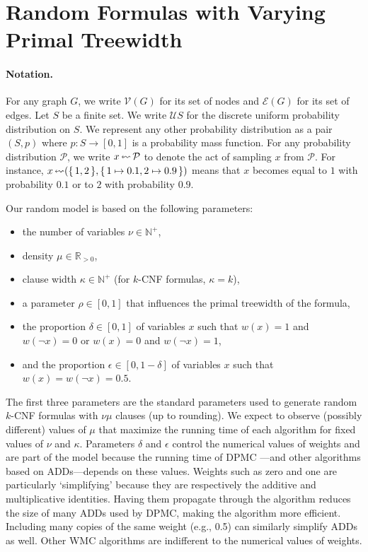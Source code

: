 \section{Random Formulas with Varying Primal Treewidth}\label{sec:model}

\paragraph*{Notation.}
For any graph $G$, we write $\mathcal{V}(G)$ for its set of nodes and
$\mathcal{E}(G)$ for its set of edges. Let $S$ be a finite set. We write
$\mathcal{U}S$ for the discrete uniform probability distribution on $S$. We
represent any other probability distribution as a pair $(S, p)$ where $p\colon S
\to [0, 1]$ is a probability mass function. For any probability distribution
$\mathcal{P}$, we write $x \leftlsquigarrow \mathcal{P}$ to denote the act of
sampling $x$ from $\mathcal{P}$. For instance, $x \leftlsquigarrow (\{\, 1, 2 \,\}, \{\, 1 \mapsto 0.1, 2 \mapsto 0.9 \,\})$ means that $x$ becomes equal to $1$ with probability $0.1$ or to $2$ with probability $0.9$.

Our random model is based on the following parameters:
\begin{itemize}
\item the number of variables $\nu \in \mathbb{N}^+$,
\item density $\mu \in \mathbb{R}_{>0}$,
\item clause width $\kappa \in \mathbb{N}^+$ (for $k$-CNF formulas, $\kappa =
  k$),
\item a parameter $\rho \in [0, 1]$ that influences the primal treewidth of
  the formula,
\item the proportion $\delta \in [0, 1]$ of variables $x$ such that $w(x) = 1$
  and $w(\neg x) = 0$ or $w(x) = 0$ and $w(\neg x) = 1$,
\item and the proportion $\epsilon \in [0, 1-\delta]$ of variables $x$ such that
  $w(x) = w(\neg x) = 0.5$.
\end{itemize}
The first three parameters are the standard parameters used to generate random
$k$-CNF formulas with $\nu\mu$ clauses (up to rounding). We expect to observe
(possibly different) values of $\mu$ that maximize the running time of each
algorithm for fixed values of $\nu$ and $\kappa$. Parameters $\delta$ and
$\epsilon$ control the numerical values of weights and are part of the model
because the running time of \textsc{DPMC} \citep{DBLP:conf/cp/DudekPV20}---and
other algorithms based on ADDs---depends on these values. Weights such as zero
and one are particularly `simplifying' because they are respectively the
additive and multiplicative identities. Having them propagate through the
algorithm reduces the size of many ADDs used by \textsc{DPMC}, making the
algorithm more efficient. Including many copies of the same weight (e.g., 0.5)
can similarly simplify ADDs as well. Other WMC algorithms are indifferent to the
numerical values of weights.

